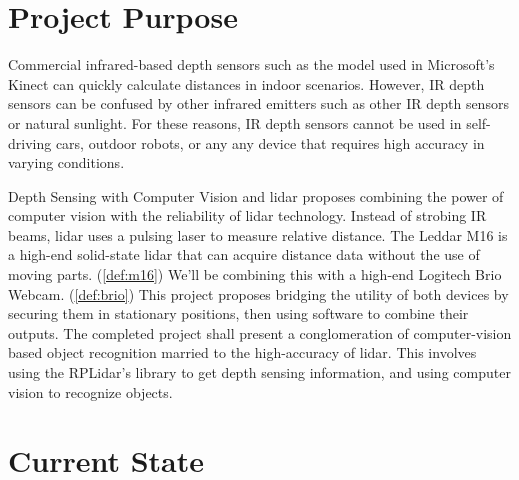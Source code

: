 \documentclass[onecolumn, draftclsnofoot,10pt, compsoc]{IEEEtran}
\begin{document}
\begin{singlespace}
		
	\section{Project Purpose}
		Commercial infrared-based depth sensors such as the model used in Microsoft's Kinect can quickly calculate distances in indoor scenarios.
		However, IR depth sensors can be confused by other infrared emitters such as other IR depth sensors or natural sunlight.
		For these reasons, IR depth sensors cannot be used in self-driving cars, outdoor robots, or any any device that requires high accuracy in varying conditions.


		Depth Sensing with Computer Vision and lidar proposes combining the power of computer vision with the reliability of lidar technology.
		Instead of strobing IR beams, lidar uses a pulsing laser to measure relative distance.
		The Leddar M16 is a high-end solid-state lidar that can acquire distance data without the use of moving parts. (\ref{def:m16})
		We'll be combining this with a high-end Logitech Brio Webcam. (\ref{def:brio})
		This project proposes bridging the utility of both devices by securing them in stationary positions, then using software to combine their outputs.
		The completed project shall present a conglomeration of computer-vision based object recognition married to the high-accuracy of lidar.
		This involves using the RPLidar's library to get depth sensing information, and using computer vision to recognize objects.

	\section{Current State}

\end{singlespace}
\end{document}
